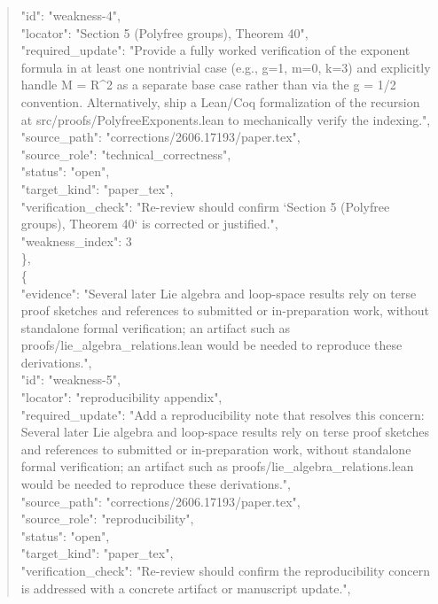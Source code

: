 \documentclass[11pt]{article}
\begin{document}
\begin{quote}
      "id": "weakness-4",\\
      "locator": "Section 5 (Polyfree groups), Theorem 40",\\
      "required\_update": "Provide a fully worked verification of the exponent formula in at least one nontrivial case (e.g., g=1, m=0, k=3) and explicitly handle M = R\^{}2 as a separate base case rather than via the g = 1/2 convention. Alternatively, ship a Lean/Coq formalization of the recursion at src/proofs/PolyfreeExponents.lean to mechanically verify the indexing.",\\
      "source\_path": "corrections/2606.17193/paper.tex",\\
      "source\_role": "technical\_correctness",\\
      "status": "open",\\
      "target\_kind": "paper\_tex",\\
      "verification\_check": "Re-review should confirm `Section 5 (Polyfree groups), Theorem 40` is corrected or justified.",\\
      "weakness\_index": 3\\
    \},\\
    \{\\
      "evidence": "Several later Lie algebra and loop-space results rely on terse proof sketches and references to submitted or in-preparation work, without standalone formal verification; an artifact such as proofs/lie\_algebra\_relations.lean would be needed to reproduce these derivations.",\\
      "id": "weakness-5",\\
      "locator": "reproducibility appendix",\\
      "required\_update": "Add a reproducibility note that resolves this concern: Several later Lie algebra and loop-space results rely on terse proof sketches and references to submitted or in-preparation work, without standalone formal verification; an artifact such as proofs/lie\_algebra\_relations.lean would be needed to reproduce these derivations.",\\
      "source\_path": "corrections/2606.17193/paper.tex",\\
      "source\_role": "reproducibility",\\
      "status": "open",\\
      "target\_kind": "paper\_tex",\\
      "verification\_check": "Re-review should confirm the reproducibility concern is addressed with a concrete artifact or manuscript update.",\\

\end{quote}
\end{document}
